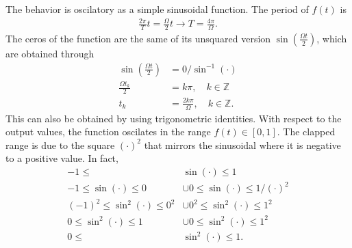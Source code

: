\documentclass[letterpaper,11pt,twoside]{article}
\begin{document}
The behavior is oscilatory as a simple sinusoidal function. The period of $f(t)$ is  
\begin{align*}
  \frac{2\pi}{T}t=\frac{\Omega}{2}t\longrightarrow T=\frac{4\pi}{\Omega}.
\end{align*}
The ceros of the function are the same of its unsquared version $\sin(\frac{\Omega t}{2})$, which are obtained through
\begin{align*}
  \sin\left(\frac{\Omega t}{2}\right)&=0/\sin^{-1}(\cdot)\\
  \frac{\Omega t_k}{2}&=k\pi,\quad k\in\mathbb{Z}\\
  t_k&=\frac{2k\pi}{\Omega},\quad k\in\mathbb{Z}.
\end{align*} 
This can also be obtained by using trigonometric identities.
With respect to the output values, the function oscilates in the range $f(t)\in[0,1]$. The clapped
range is due to the square $(\cdot)^2$ that mirrors the sinusoidal where it is negative to a positive value.
In fact, 
\begin{align*}
  -1\leq&\sin(\cdot)\leq1\\
  -1\leq\sin(\cdot)\leq0&\cup0\leq\sin(\cdot)\leq1\bigr/(\cdot)^2\\
  (-1)^2\leq\sin^2(\cdot)\leq0^2&\cup0^2\leq\sin^2(\cdot)\leq1^2\\
  0\leq\sin^2(\cdot)\leq1&\cup0\leq\sin^2(\cdot)\leq1^2\\
  0\leq&\sin^2(\cdot)\leq1.
\end{align*}

\end{document}
